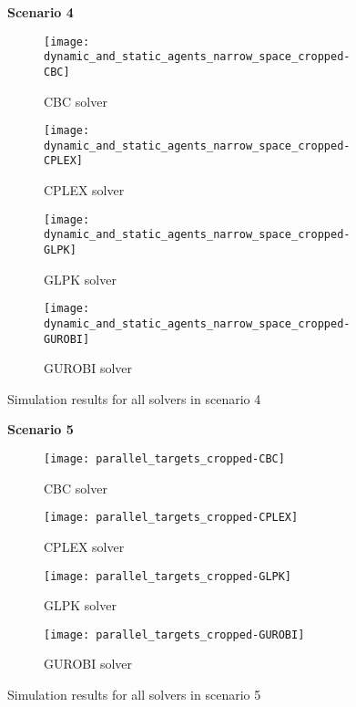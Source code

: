 \begin{figure}[H]
    \centering
    \textbf{Scenario 4}\par \medskip
    \begin{subfigure}{0.49\textwidth}
        \centering
        \texttt{[image: dynamic\_and\_static\_agents\_narrow\_space\_cropped-CBC]}
        \caption{CBC solver}
    \end{subfigure}
    \begin{subfigure}{0.49\textwidth}
        \centering
        \texttt{[image: dynamic\_and\_static\_agents\_narrow\_space\_cropped-CPLEX]}
        \caption{CPLEX solver}
    \end{subfigure}
    \begin{subfigure}{0.49\textwidth}
        \centering
        \texttt{[image: dynamic\_and\_static\_agents\_narrow\_space\_cropped-GLPK]}
        \caption{GLPK solver}
    \end{subfigure}
    \begin{subfigure}{0.49\textwidth}
        \centering
        \texttt{[image: dynamic\_and\_static\_agents\_narrow\_space\_cropped-GUROBI]}
        \caption{GUROBI solver}
    \end{subfigure}
    \caption{Simulation results for all solvers in scenario 4}
	\label{fig:dynamic_and_static_agents_narrow_space_cropped}
\end{figure}

\begin{figure}[H]
    \centering
    \textbf{Scenario 5}\par \medskip
    \begin{subfigure}{0.49\textwidth}
        \centering
        \texttt{[image: parallel\_targets\_cropped-CBC]}
        \caption{CBC solver}
    \end{subfigure}
    \begin{subfigure}{0.49\textwidth}
        \centering
        \texttt{[image: parallel\_targets\_cropped-CPLEX]}
        \caption{CPLEX solver}
    \end{subfigure}
    \begin{subfigure}{0.49\textwidth}
        \centering
        \texttt{[image: parallel\_targets\_cropped-GLPK]}
        \caption{GLPK solver}
    \end{subfigure}
    \begin{subfigure}{0.49\textwidth}
        \centering
        \texttt{[image: parallel\_targets\_cropped-GUROBI]}
        \caption{GUROBI solver}
    \end{subfigure}
    \caption{Simulation results for all solvers in scenario 5}
    \label{fig:parallel_targets_cropped}
\end{figure}


